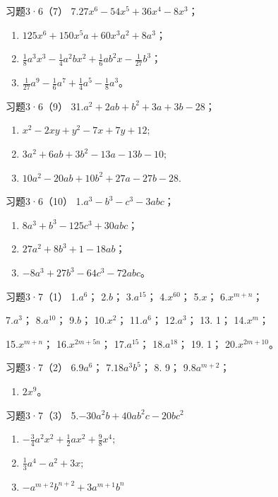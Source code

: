 习题3·6（7） 7.\(27x^{6} - 54x^{5} + 36x^{4} - 8x^{3}\)；

\begin{enumerate}[start=8]
\item
  \(125x^{6} + 150x^{5}a + 60x^{3}a^{2} + 8a^{3}\)；
\item
  \(\frac{1}{8} a^{3}x^{3} - \frac{1}{4} a^{2}bx^{2} + \frac{1}{6} ab^{2}x - \frac{1}{27} b^{3}\)；
\item
  \(\frac{1}{27} a^9 - \frac{1}{6} a^7 + \frac{1}{4} a^5 - \frac{1}{8} a^3\)。
\end{enumerate}

习题3·6（9） 31.\(a^2 + 2ab + b^2 + 3a + 3b - 28\)；

\begin{enumerate}[start=32]
\item
  \(x^{2} - 2xy + y^{2} - 7x + 7y + 12;\)
\item
  \(3a^{2} + 6ab + 3b^{2} - 13a - 13b - 10;\)
\item
  \(10a^{2} - 20ab + 10b^{2} + 27a - 27b - 28.\)
\end{enumerate}

习题3·6（10） 1.\(a^3 - b^3 - c^3 - 3abc\)；
\begin{enumerate}[start=2]
\item
  \(8a^3 + b^3 - 125c^3 + 30abc\)；
\item
  \(27a^{2} + 8b^{3} + 1 - 18ab\)；
\item
  \(-8a^{3} + 27b^{3} - 64c^{3} - 72abc\)。
\end{enumerate}

习题3·7（1） 1.\(a^6\)； 2.\(b\)； 3.\(a^{15}\)； 4.\(x^{60}\)；
5.\(x\)； 6.\(x^{m+n}\)；

7.\(a^3\)； 8.\(a^{10}\)； 9.\(b\)； 10.\(x^2\)； 11.\(a^6\)；
12.\(a^3\)； 13. 1； 14.\(x^m\)；

15.\(x^{m + n}\)； 16.\(x^{2m + 5n}\)； 17.\(a^{15}\)； 18.\(a^{18}\)；
19. 1； 20.\(x^{2m + 10}\)。

习题3·7（2） 6.\(9a^{6}\)； 7.\(18a^{3}b^{5}\)； 8. 9； 9.\(8a^{m+2}\)；
\begin{enumerate}[start=10]
\item
  \(2x^{9}\)。
\end{enumerate}

习题3·7（3） 5.\(-30a^{2}b + 40ab^{2}c - 20bc^{2}\)

\begin{enumerate}[start=6]
\item
  \(-\frac{3}{4} a^2 x^2 + \frac{1}{2} ax^2 + \frac{9}{8} x^4;\)
\item
  \(\frac{1}{3} a^4 - a^2 + 3x;\)
\item
  \(-a^{m+2}b^{n+2} + 3a^{m+1}b^n\)
\end{enumerate}

